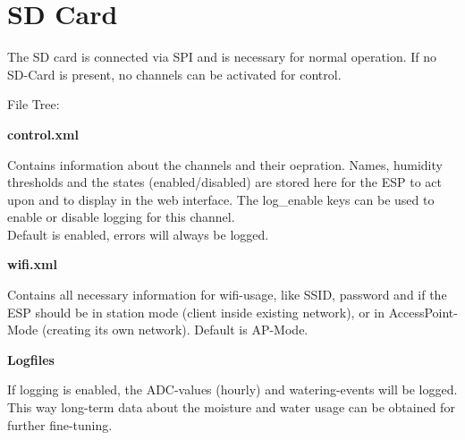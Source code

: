 \chapter{SD Card}
The SD card is connected via SPI and is necessary for normal operation. If no SD-Card is present, no channels can be activated for control. 

File Tree:

\vspace{0.5cm}
\textbf{control.xml}

Contains information about the channels and their oepration. Names, humidity thresholds and the states (enabled/disabled) are stored here for the ESP to act upon and to display in the web interface. The log\_enable keys can be used to enable or disable logging for this channel.\\
Default is enabled, errors will always be logged. 

\vspace{0.5cm}
\textbf{wifi.xml}

Contains all necessary information for wifi-usage, like SSID, password and if the ESP should be in station mode (client inside existing network), or in AccessPoint-Mode (creating its own network). Default is AP-Mode.

\vspace{0.5cm}
\textbf{Logfiles}

If logging is enabled, the ADC-values (hourly) and watering-events will be logged. This way long-term data about the moisture and water usage can be obtained for further fine-tuning.